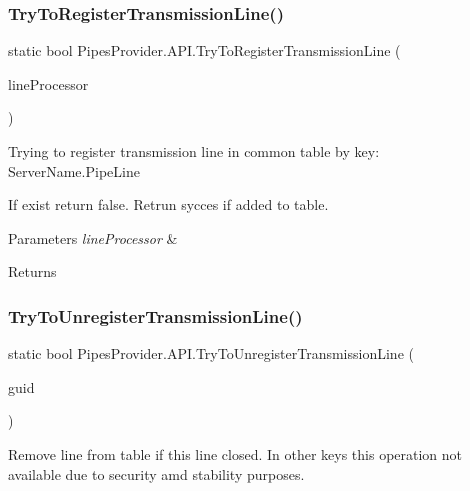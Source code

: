 \subsubsection{\texorpdfstring{Try\+To\+Register\+Transmission\+Line()}{TryToRegisterTransmissionLine()}}
{\footnotesize\ttfamily static bool Pipes\+Provider.\+A\+P\+I.\+Try\+To\+Register\+Transmission\+Line (\begin{DoxyParamCaption}\item[{\mbox{\hyperlink{class_pipes_provider_1_1_transmission_line}{Transmission\+Line}}}]{line\+Processor }\end{DoxyParamCaption})\hspace{0.3cm}{\ttfamily [static]}}



Trying to register transmission line in common table by key\+: Server\+Name.\+Pipe\+Line 

If exist return false. Retrun sycces if added to table. 


\begin{DoxyParams}{Parameters}
{\em line\+Processor} & \\
\hline
\end{DoxyParams}
\begin{DoxyReturn}{Returns}

\end{DoxyReturn}
\mbox{\label{class_pipes_provider_1_1_a_p_i_ab0578d8470c97267dd9c6e2126cb69f0}} 
\subsubsection{\texorpdfstring{Try\+To\+Unregister\+Transmission\+Line()}{TryToUnregisterTransmissionLine()}}
{\footnotesize\ttfamily static bool Pipes\+Provider.\+A\+P\+I.\+Try\+To\+Unregister\+Transmission\+Line (\begin{DoxyParamCaption}\item[{string}]{guid }\end{DoxyParamCaption})\hspace{0.3cm}{\ttfamily [static]}}



Remove line from table if this line closed. In other keys this operation not available due to security amd stability purposes. 


